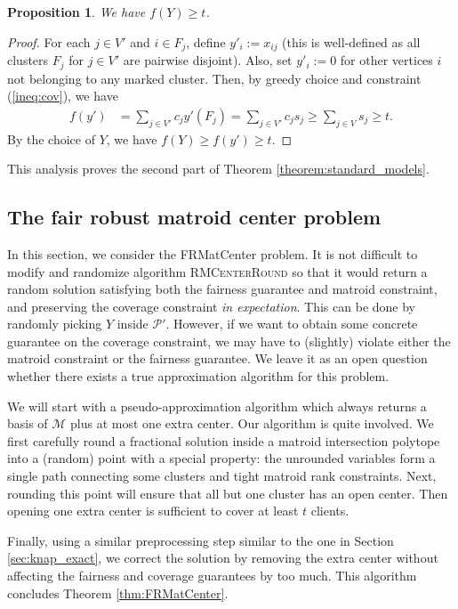 \documentclass[a4paper,11pt]{article}
\newtheorem{proposition}[theorem]{Proposition}
\newcommand{\M}{\mathcal{M}}
\renewcommand{\P}{\mathcal{P}}
\begin{document}
\begin{proposition} We have $f(Y) \geq t$.
\label{prop:fbound2}
\end{proposition}
\begin{proof}
For each $j \in V'$ and $i \in F_j$, define $y'_i := x_{ij}$ (this is well-defined as all clusters $F_j$ for $j \in V'$ are pairwise disjoint). Also, set $y'_i := 0$ for other vertices $i$ not belonging to any marked cluster. Then, by greedy choice and constraint (\ref{ineq:cov}), we have
\begin{align*}
	f(y') &= \sum_{j \in V'} c_j y'(F_j) = \sum_{j \in V'} c_j s_j \geq \sum_{j \in V}  s_j \geq t.
\end{align*}
By the choice of $Y$, we have $f(Y) \geq f(y') \geq t$.
\end{proof}
This analysis proves the second part of Theorem \ref{theorem:standard_models}.






\subsection{The fair robust matroid center problem}

In this section, we consider the \textsf{FRMatCenter} problem. It is not difficult to modify and randomize algorithm \textsc{RMCenterRound} so that it would return a random solution satisfying both the fairness guarantee and matroid constraint, and preserving the coverage constraint \emph{in expectation}. This can be done by randomly picking $Y$ inside $\P'$. However, if we want to obtain some concrete guarantee on the coverage constraint, we may have to (slightly) violate either the matroid constraint or the fairness guarantee. We leave it as an open question whether there exists a true approximation algorithm for this problem.

We will start with a pseudo-approximation algorithm which always returns a basis of $\M$ plus at most one extra center.  Our algorithm is quite involved. We first carefully round a fractional solution inside a matroid intersection polytope into a (random) point with a special property: the unrounded variables form a single path connecting some clusters and tight matroid rank constraints. Next, rounding this point will ensure that all but one cluster has an open center. Then opening one extra center is sufficient to cover at least $t$ clients.

Finally, using a similar preprocessing step similar to the one in Section \ref{sec:knap_exact}, we correct the solution by removing the extra center without affecting the fairness and coverage guarantees by too much. This algorithm concludes Theorem \ref{thm:FRMatCenter}.
\end{document}
